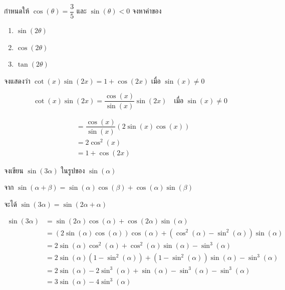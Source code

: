 \begin{examplebox}
	กำหนดให้ $\cos(\theta) = \dfrac{3}{5}$ และ $\sin(\theta) < 0$ จงหาค่าของ
	\begin{enumerate}
		\item $\sin(2\theta)$
		\item $\cos(2\theta)$
		\item $\tan(2\theta)$
	\end{enumerate}
\end{examplebox}
\solution
\newpage

\begin{examplebox}
	จงแสดงว่า $\cot(x)\sin(2x)=1+\cos(2x)$ เมื่อ $\sin(x)\neq 0$
\end{examplebox}

\proof
\[
\cot(x)\sin(2x)
=
\dfrac{\cos(x)}{\sin(x)}\sin(2x)
\quad \text{เมื่อ } \sin(x)\neq 0
\]

\[
\begin{aligned}
	&=
	\dfrac{\cos(x)}{\sin(x)}\left(2\sin(x)\cos(x)\right)
	\\
	&=
	2\cos^{2}(x)
	\\
	&=
	1+\cos(2x)
\end{aligned}
\]

\begin{examplebox}
	จงเขียน $\sin(3\alpha)$ ในรูปของ $\sin(\alpha)$
\end{examplebox}
\solution
\vspace{0.5em}
จาก $\sin(\alpha+\beta)=\sin(\alpha)\cos(\beta)+\cos(\alpha)\sin(\beta)$

จะได้ $\sin(3\alpha)=\sin(2\alpha+\alpha)$

\[
\begin{aligned}
	\sin(3\alpha)
	&=
	\sin(2\alpha)\cos(\alpha)
	+
	\cos(2\alpha)\sin(\alpha)
	\\
	&=
	\left(2\sin(\alpha)\cos(\alpha)\right)\cos(\alpha)
	+
	\left(\cos^{2}(\alpha)-\sin^{2}(\alpha)\right)\sin(\alpha)
	\\
	&=
	2\sin(\alpha)\cos^{2}(\alpha)
	+
	\cos^{2}(\alpha)\sin(\alpha)
	-
	\sin^{3}(\alpha)
	\\
	&=
	2\sin(\alpha)\left(1-\sin^{2}(\alpha)\right)
	+
	\left(1-\sin^{2}(\alpha)\right)\sin(\alpha)
	-
	\sin^{3}(\alpha)
	\\
	&=
	2\sin(\alpha)-2\sin^{3}(\alpha)
	+
	\sin(\alpha)-\sin^{3}(\alpha)-\sin^{3}(\alpha)
	\\
	&=
	3\sin(\alpha)-4\sin^{3}(\alpha)
\end{aligned}
\]

\newpage

